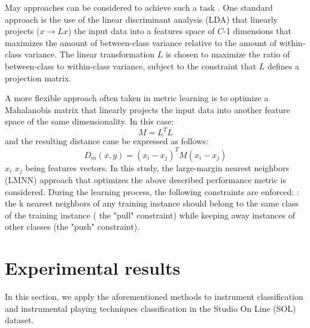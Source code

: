 \documentclass{article}
\begin{document}
May approaches can be considered to achieve such a task \cite{}. One standard approach is the use of the linear discriminant analysis (LDA) that linearly projects ($x \rightarrow L x$) the input data into a features space of $C$-1 dimensions that maximizes the amount of between-class variance
relative to the amount of within-class variance. The linear transformation $L$ is chosen to maximize the ratio of between-class to within-class variance,
subject to the constraint that $L$ defines a projection matrix.


A more flexible approach often taken in metric learning \cite{bellet2013survey} is to optimize a Mahalanobis matrix that linearly projects the input data into another feature space of the same dimensionality. In this case:
\begin{equation}
  M=L^T L
\end{equation}
and the resulting distance cane be expressed as follows:
\begin{equation}
  D_m(x, y) = (x_i-x_j)^T M(x_i-x_j)
\end{equation}
$x_i$ $x_j$ being features vectors. In this study, the large-margin nearest neighbors (LMNN) approach \cite{weinberger2006nips, weinberger2009jmlr} that optimizes the above described performance metric is considered. During the learning process, the following constraints are enforced: : the
k nearest neighbors of any training instance should belong to the
same class of the training instance ( the "pull" constraint) while keeping away instances of other classes (the "push" constraint).



\section{Experimental results} \label{sec:exp}
In this section, we apply the aforementioned methods to instrument classification and instrumental playing techniques classification in the Studio On Line (SOL) dataset.
\end{document}
